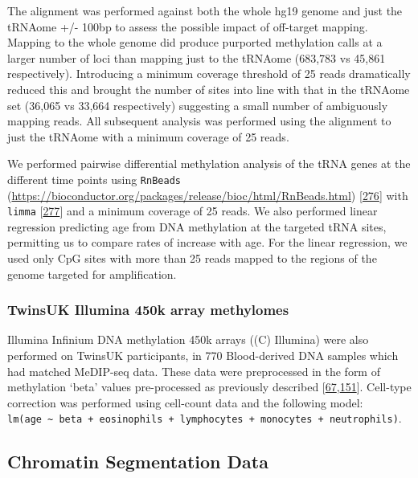\documentclass[
]{book}
\begin{document}
The alignment was performed against both the whole hg19 genome and just the tRNAome +/- 100bp to assess the possible impact of off-target mapping. Mapping to the whole genome did produce purported methylation calls at a larger number of loci than mapping just to the tRNAome (683,783 vs 45,861 respectively).
Introducing a minimum coverage threshold of 25 reads dramatically reduced this and brought the number of sites into line with that in the tRNAome set (36,065 vs 33,664 respectively) suggesting a small number of ambiguously mapping reads. All subsequent analysis was performed using the alignment to just the tRNAome with a minimum coverage of 25 reads.

We performed pairwise differential methylation analysis of the tRNA genes at the different time points using \texttt{RnBeads} (\url{https://bioconductor.org/packages/release/bioc/html/RnBeads.html}) {[}\protect\hyperlink{ref-Muller2019}{276}{]} with \texttt{limma} {[}\protect\hyperlink{ref-Ritchie2015}{277}{]} and a minimum coverage of 25 reads.
We also performed linear regression predicting age from DNA methylation at the targeted tRNA sites, permitting us to compare rates of increase with age.
For the linear regression, we used only CpG sites with more than 25 reads mapped to the regions of the genome targeted for amplification.

\hypertarget{twinsuk-illumina-450k-array-methylomes}{%
\subsubsection{TwinsUK Illumina 450k array methylomes}\label{twinsuk-illumina-450k-array-methylomes}}

Illumina Infinium DNA methylation 450k arrays ((C) Illumina) were also performed on TwinsUK participants, in 770 Blood-derived DNA samples which had matched MeDIP-seq data.
These data were preprocessed in the form of methylation `beta' values pre-processed as previously described {[}\protect\hyperlink{ref-Bell2017a}{67},\protect\hyperlink{ref-Bell2016}{151}{]}.
Cell-type correction was performed using cell-count data and the following model: \texttt{lm(age\ \textasciitilde{}\ beta\ +\ eosinophils\ +\ lymphocytes\ +\ monocytes\ +\ neutrophils)}.

\hypertarget{chromatin-segmentation-data}{%
\subsection{Chromatin Segmentation Data}\label{chromatin-segmentation-data}}
\end{document}
